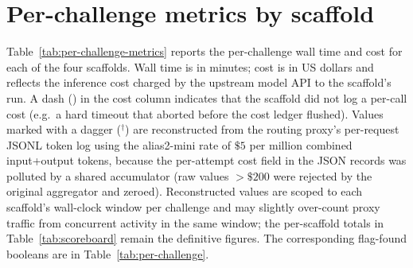 \FloatBarrier
\section{Per-challenge metrics by scaffold}\label{app:per-challenge-metrics}

Table~\ref{tab:per-challenge-metrics} reports the per-challenge wall time and cost for each of the four scaffolds. Wall time is in minutes; cost is in US dollars and reflects the inference cost charged by the upstream model API to the scaffold's run. A dash (\textemdash) in the cost column indicates that the scaffold did not log a per-call cost (e.g.\ a hard timeout that aborted before the cost ledger flushed). Values marked with a dagger ($^{\dag}$) are reconstructed from the routing proxy's per-request JSONL token log using the alias2-mini rate of $\$5$ per million combined input+output tokens, because the per-attempt cost field in the JSON records was polluted by a shared accumulator (raw values $> \$200$ were rejected by the original aggregator and zeroed). Reconstructed values are scoped to each scaffold's wall-clock window per challenge and may slightly over-count proxy traffic from concurrent activity in the same window; the per-scaffold totals in Table~\ref{tab:scoreboard} remain the definitive figures. The corresponding flag-found booleans are in Table~\ref{tab:per-challenge}.

